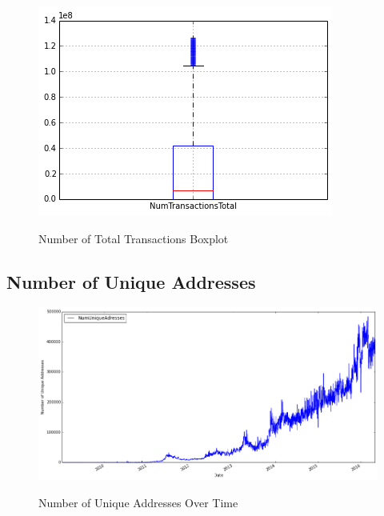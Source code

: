 \begin{figure}[bth]
  \myfloatalign
  {\includegraphics[width=1\linewidth]
    {gfx/n-transactions-total-boxplot}}
  \caption{Number of Total Transactions
    Boxplot}
  \label{fig:n-transactions-total-boxplot}
\end{figure}

\clearpage

\subsection{Number of Unique Addresses}
\label{sec:n-unique-addresses}

\begin{figure}[bth]
  \myfloatalign
  {\includegraphics[width=1\linewidth]
    {gfx/n-unique-addresses-over-time}}
  \caption{Number of Unique Addresses
    Over Time}
  \label{fig:n-unique-addresses-over-time}
\end{figure}

